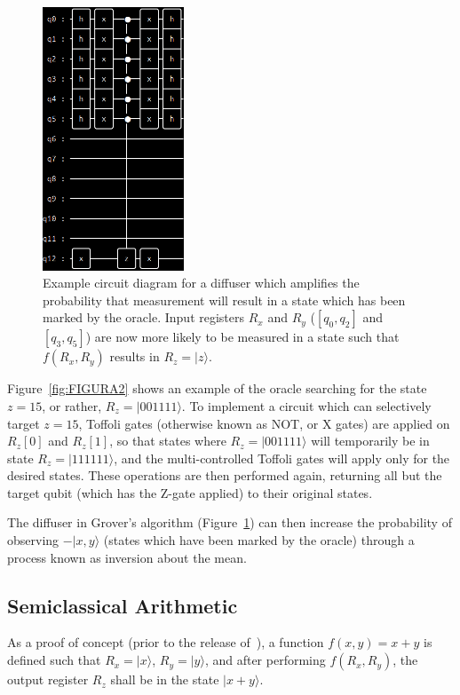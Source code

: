 \documentclass[twocolumn]{cinc}
\begin{document}
  \begin{figure}[!h]
  \centering
  \includegraphics[width=4.2cm]{diffuse.png}
  \caption{Example circuit diagram for a diffuser which amplifies the probability that
  measurement will result in a state which has been marked by the oracle.
  Input registers $R_x$ and $R_y$ ($[q_0,q_2]$ and $[q_3,q_5]$) are now 
  more likely to be measured in a state such that $f(R_x,R_y)$ results in $R_z=|z\rangle$.}\label{fig:FIGURA3}
  \end{figure}

  Figure~\ref{fig:FIGURA2} shows an example of the oracle searching for the state $z=15$,
  or rather, $R_z=|001111\rangle$. To implement a circuit which can selectively target
  $z=15$, Toffoli gates (otherwise known as NOT, or X gates) are applied on 
  $R_z[0]$ and $R_z[1]$, so that states where $R_z=|001111\rangle$ will temporarily be in
  state $R_z=|111111\rangle$, and the multi-controlled Toffoli gates\cite{multi_toffoli}
  will apply only for the desired states. These operations are then performed again,
  returning all but the target qubit (which has the Z-gate applied) to their original
  states.

  The diffuser in Grover's algorithm (Figure~\ref{fig:FIGURA3}) can then increase the 
  probability of observing $-|x,y\rangle$ (states which have been marked by the oracle) 
  through a process known as inversion about the mean.

  \subsection{Semiclassical Arithmetic} 

  As a proof of concept (prior to the release of~\cite{quantum_factoring}),
  a function $f(x,y)=x+y$ is defined such that $R_x=|x\rangle$, $R_y=|y\rangle$,
  and after performing $f(R_x,R_y)$, the output register $R_z$ shall be in the
  state $|x+y\rangle$.
  
\end{document}

